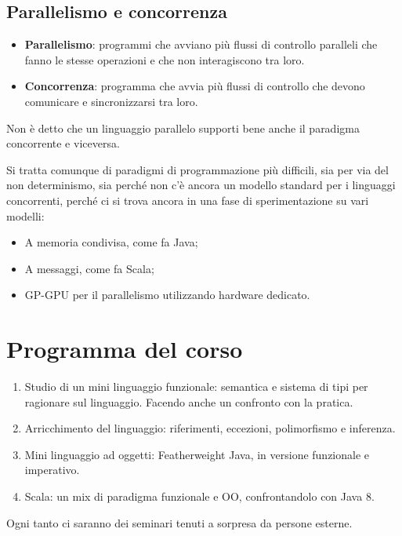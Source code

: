 \subsection{Parallelismo e concorrenza}

\begin{itemize}
\item \textbf{Parallelismo}: programmi che avviano più flussi di controllo paralleli che fanno le stesse operazioni e che non interagiscono tra loro.
\item\textbf{Concorrenza}: programma che avvia più flussi di controllo che devono comunicare e sincronizzarsi tra loro.
\end{itemize}

\noindent Non è detto che un linguaggio parallelo supporti bene anche il paradigma concorrente e viceversa.

Si tratta comunque di paradigmi di programmazione più difficili, sia per via del non determinismo, sia perché non c'è ancora un modello standard per i linguaggi concorrenti, perché ci si trova ancora in una fase di sperimentazione su vari modelli:
\begin{itemize}
	\item A memoria condivisa, come fa Java;
	\item A messaggi, come fa Scala;
	\item GP-GPU per il parallelismo utilizzando hardware dedicato.
\end{itemize}

\section{Programma del corso}

\begin{enumerate}
	\item Studio di un mini linguaggio funzionale: semantica e sistema di tipi per ragionare sul linguaggio. Facendo anche un confronto con la pratica.
	\item Arricchimento del linguaggio: riferimenti, eccezioni, polimorfismo e inferenza.
	\item Mini linguaggio ad oggetti: Featherweight Java, in versione funzionale e imperativo.
	\item Scala: un mix di paradigma funzionale e OO, confrontandolo con Java 8.
\end{enumerate}

\noindent Ogni tanto ci saranno dei seminari tenuti a sorpresa da persone esterne.

